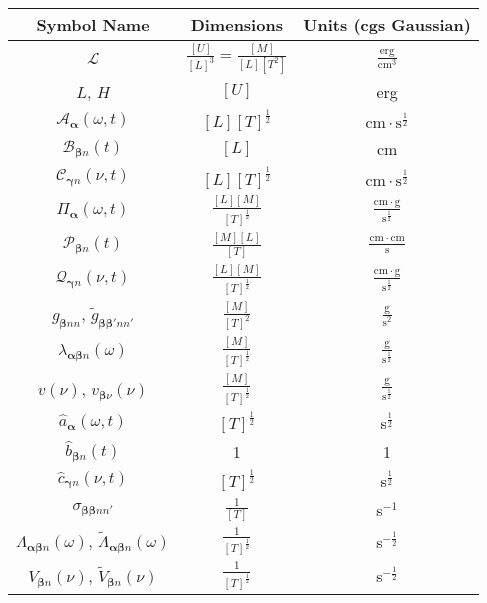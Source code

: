 \documentclass{article}
\begin{document}
\begin{center}
\def\arraystretch{1.5}
\begin{longtable}{c|c|c}
    Symbol Name & Dimensions & Units (cgs Gaussian) \\
    \hline
    $\mathcal{L}$ & $\frac{[U]}{[L]^3} = \frac{[M]}{[L][T^2]}$ & $\frac{\mathrm{erg}}{\mathrm{cm}^3}$\\
    $L$, $H$ & $[U]$ & erg\\
    $\mathcal{A}_{\bm{\alpha}}(\omega,t)$ & $[L][T]^\frac{1}{2}$ & $\mathrm{cm}\cdot\mathrm{s}^\frac{1}{2}$\\
    $\mathcal{B}_{\bm{\beta}n}(t)$ & $[L]$ & cm\\
    $\mathcal{C}_{\bm{\gamma}n}(\nu,t)$ & $[L][T]^\frac{1}{2}$ & $\mathrm{cm}\cdot\mathrm{s}^\frac{1}{2}$\\
    $\mathit{\Pi}_{\bm{\alpha}}(\omega,t)$ & $\frac{[L][M]}{[T]^\frac{1}{2}}$ & $\frac{\mathrm{cm}\cdot\mathrm{g}}{\mathrm{s}^\frac{1}{2}}$\\
    $\mathcal{P}_{\bm{\beta}n}(t)$ & $\frac{[M][L]}{[T]}$ & $\frac{\mathrm{cm}\cdot\mathrm{cm}}{\mathrm{s}}$\\
    $\mathcal{Q}_{\bm{\gamma}n}(\nu,t)$ & $\frac{[L][M]}{[T]^\frac{1}{2}}$ & $\frac{\mathrm{cm}\cdot\mathrm{g}}{\mathrm{s}^\frac{1}{2}}$\\
    $g_{\bm{\beta}nn}$, $\tilde{g}_{\bm{\beta}\bm{\beta}'nn'}$ & $\frac{[M]}{[T]^2}$ & $\frac{\mathrm{g}}{\mathrm{s}^2}$\\
    $\lambda_{\bm{\alpha}\bm{\beta}n}(\omega)$ & $\frac{[M]}{[T]^\frac{1}{2}}$ & $\frac{\mathrm{g}}{\mathrm{s}^\frac{1}{2}}$\\
    $v(\nu)$, $v_{\bm{\beta}\nu}(\nu)$ & $\frac{[M]}{[T]^\frac{1}{2}}$ & $\frac{\mathrm{g}}{\mathrm{s}^\frac{1}{2}}$ \\
    $\hat{a}_{\bm{\alpha}}(\omega,t)$ & $[T]^\frac{1}{2}$ & s$^\frac{1}{2}$ \\
    $\hat{b}_{\bm{\beta}n}(t)$ & 1 & 1\\
    $\hat{c}_{\bm{\gamma}n}(\nu,t)$ & $[T]^\frac{1}{2}$ & s$^\frac{1}{2}$\\
    $\sigma_{\bm{\beta}\bm{\beta}nn'}$ & $\frac{1}{[T]}$ & s$^{-1}$\\
    $\Lambda_{\bm{\alpha}\bm{\beta}n}(\omega)$, $\tilde{\Lambda}_{\bm{\alpha}\bm{\beta}n}(\omega)$ & $\frac{1}{[T]^\frac{1}{2}}$ & s$^{-\frac{1}{2}}$\\
    $V_{\bm{\beta}n}(\nu)$, $\tilde{V}_{\bm{\beta}n}(\nu)$ & $\frac{1}{[T]^\frac{1}{2}}$ & s$^{-\frac{1}{2}}$\\
\end{longtable}
\end{center}
\end{document}
